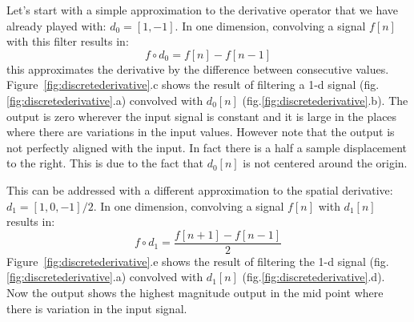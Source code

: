 Let's start with a simple approximation to the derivative operator that we have already played with: $d_0  = \left[1, -1 \right]$. In one dimension, convolving a signal $f \left[n \right]$ with this filter results in:
\begin{equation}
f \circ d_0 = f \left[n \right] - f \left[n-1 \right]
\end{equation}
this approximates the derivative by the difference between consecutive values. Figure~\ref{fig:discretederivative}.c shows the result of filtering a 1-d signal (fig.\ref{fig:discretederivative}.a) convolved with $d_0 \left[n\right]$ (fig.\ref{fig:discretederivative}.b). The output is zero wherever the input signal is constant and it is large in the places where there are variations in the input values. However note that the output is not perfectly aligned with the input. In fact there is a half a sample displacement to the right. This is due to the fact that $d_0 \left[n\right]$ is not centered around the origin. 

This can be addressed with a different approximation to the spatial derivative: $d_1  = \left[1, 0, -1 \right]/2$. In one dimension, convolving a signal $f \left[n \right]$ with $d_1 \left[n\right]$ results in:
\begin{equation}
f \circ d_1 = \frac{f \left[n+1 \right] - f \left[n-1 \right]}{2}
\end{equation}
Figure~\ref{fig:discretederivative}.e shows the result of filtering the 1-d signal (fig.\ref{fig:discretederivative}.a) convolved with $d_1 \left[n\right]$ (fig.\ref{fig:discretederivative}.d). Now the output shows the highest magnitude output in the mid point where there is variation in the input signal. 

